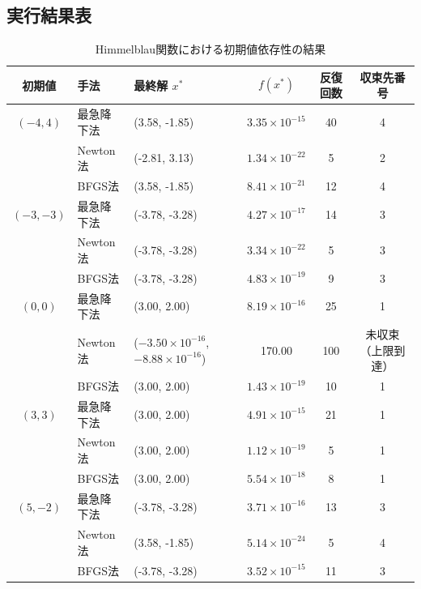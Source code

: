 \documentclass[11pt,a4paper]{ltjsarticle}
\begin{document}
\subsection{実行結果表}
\begin{table}[hbtp]
    \centering
    \caption{Himmelblau関数における初期値依存性の結果}
    \begin{tabular}{cllccc}
        \toprule
        初期値 & 手法 & 最終解 $x^*$ & $f(x^*)$ & 反復回数 & 収束先番号 \\
        \midrule
        $(-4, 4)$ 
        & 最急降下法 & (3.58, -1.85)  & $3.35 \times 10^{-15}$ & 40 & 4 \\
        & Newton法  & (-2.81, 3.13)  & $1.34 \times 10^{-22}$ & 5 & 2 \\
        & BFGS法    & (3.58, -1.85)  & $8.41 \times 10^{-21}$ & 12 & 4 \\
        \midrule
        $(-3, -3)$ 
        & 最急降下法 & (-3.78, -3.28) & $4.27 \times 10^{-17}$ & 14 & 3 \\
        & Newton法  & (-3.78, -3.28) & $3.34 \times 10^{-22}$ & 5 & 3 \\
        & BFGS法    & (-3.78, -3.28) & $4.83 \times 10^{-19}$ & 9 & 3 \\
        \midrule
        $(0, 0)$ 
        & 最急降下法 & (3.00, 2.00)   & $8.19 \times 10^{-16}$ & 25 & 1 \\
        & Newton法  & ($-3.50 \times 10^{-16}$, $-8.88 \times 10^{-16}$) & 170.00 & 100 & 未収束（上限到達） \\
        & BFGS法    & (3.00, 2.00)   & $1.43 \times 10^{-19}$ & 10 & 1 \\
        \midrule
        $(3, 3)$ 
        & 最急降下法 & (3.00, 2.00)   & $4.91 \times 10^{-15}$ & 21 & 1 \\
        & Newton法  & (3.00, 2.00)   & $1.12 \times 10^{-19}$ & 5 & 1 \\
        & BFGS法    & (3.00, 2.00)   & $5.54 \times 10^{-18}$ & 8  & 1 \\
        \midrule
        $(5, -2)$ 
        & 最急降下法 & (-3.78, -3.28) & $3.71 \times 10^{-16}$ & 13 & 3 \\
        & Newton法  & (3.58, -1.85)  & $5.14 \times 10^{-24}$ & 5 & 4 \\
        & BFGS法    & (-3.78, -3.28) & $3.52 \times 10^{-15}$ & 11 & 3 \\
        \bottomrule
    \end{tabular}
\end{table}
\end{document}
